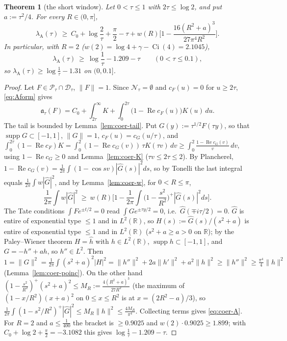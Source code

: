 \documentclass[11pt]{amsart}
\newtheorem{theorem}{Theorem}[section]
\theoremstyle{definition}
\theoremstyle{remark}
\newcommand{\R}{\mathbb R}
\newcommand{\Rel}{\operatorname{Re}}
\newcommand{\supp}{\operatorname{supp}}
\newcommand{\cF}{c_F}
\begin{document}
\begin{theorem}[the short window]\label{thm:coer-A}
Let $0<\tau\le1$ with $2\tau\le\log2$, and put $a:=\tau^2/4$. For every $R\in(0,\pi]$,
\begin{equation}\label{eq:coer-A}
\lambda_{\mathrm A}(\tau)\ \ge\ C_0+\log\frac2\tau+\frac\pi2-\tau+w(R)\Big[1-\frac{16(R^2+a)^3}{27\pi^4R^2}\Big].
\end{equation}
In particular, with $R=2$ ($w(2)=\log4+\gamma-\operatorname{Ci}(4)=2.1045$),
\[
\lambda_{\mathrm A}(\tau)\ \ge\ \log\frac1\tau-1.209-\tau\qquad(0<\tau\le0.1),
\]
so $\lambda_{\mathrm A}(\tau)\ge\log\frac1\tau-1.31$ on $(0,0.1]$.
\end{theorem}
\begin{proof}
Let $F\in\mathcal P_\tau\cap\mathcal D_\tau$, $\|F\|=1$. Since $\mathcal N_\tau=\emptyset$ and $\cF(u)=0$ for
$u\ge2\tau$, \eqref{eq:Aform} gives
\[
\mathfrak a_\tau(F)=C_0+\int_{2\tau}^\infty K+\int_0^{2\tau}\big(1-\Rel\cF(u)\big)K(u)\,du .
\]
The tail is bounded by Lemma~\ref{lem:coer-tail}. Put $G(y):=\tau^{1/2}F(\tau y)$, so that $\supp G\subset[-1,1]$,
$\|G\|=1$, $\cF(u)=c_G(u/\tau)$, and
$\int_0^{2\tau}(1-\Rel\cF)K=\int_0^2(1-\Rel c_G(v))\,\tau K(\tau v)\,dv\ge\int_0^2\frac{1-\Rel c_G(v)}v\,dv$,
using $1-\Rel c_G\ge0$ and Lemma~\ref{lem:coer-K} ($\tau v\le2\tau\le2$). By Plancherel,
$1-\Rel c_G(v)=\frac1{2\pi}\int(1-\cos sv)|\widehat G(s)|^2ds$, so by Tonelli the last integral equals
$\frac1{2\pi}\int w|\widehat G|^2$, and by Lemma~\ref{lem:coer-w}, for $0<R\le\pi$,
\[
\frac1{2\pi}\int w|\widehat G|^2\ \ge\ w(R)\Big[1-\frac1{2\pi}\int\Big(1-\frac{s^2}{R^2}\Big)^+|\widehat G(s)|^2ds\Big].
\]
The Tate conditions $\int Fe^{\pm t/2}=0$ read $\int Ge^{\pm\tau y/2}=0$, i.e.\ $\widehat G(\mp i\tau/2)=0$.
$\widehat G$ is entire of exponential type $\le1$ and in $L^2(\R)$, so $H(s):=\widehat G(s)/(s^2+a)$ is entire of
exponential type $\le1$ and in $L^2(\R)$ ($s^2+a\ge a>0$ on $\R$); by the Paley--Wiener theorem $H=\widehat h$ with
$h\in L^2(\R)$, $\supp h\subset[-1,1]$, and $G=-h''+ah$, so $h''\in L^2$. Then
$1=\|G\|^2=\frac1{2\pi}\int(s^2+a)^2|H|^2=\|h''\|^2+2a\|h'\|^2+a^2\|h\|^2\ge\|h''\|^2\ge\frac{\pi^4}4\|h\|^2$
(Lemma~\ref{lem:coer-poinc}). On the other hand $(1-\frac{s^2}{R^2})^+(s^2+a)^2\le M_R:=\frac{4(R^2+a)^3}{27R^2}$
(the maximum of $(1-x/R^2)(x+a)^2$ on $0\le x\le R^2$ is at $x=(2R^2-a)/3$), so
$\frac1{2\pi}\int(1-s^2/R^2)^+|\widehat G|^2\le M_R\|h\|^2\le\frac{4M_R}{\pi^4}$. Collecting terms gives
\eqref{eq:coer-A}. For $R=2$ and $a\le\frac1{400}$ the bracket is $\ge0.9025$ and $w(2)\cdot0.9025\ge1.899$;
with $C_0+\log2+\frac\pi2=-3.1082$ this gives $\log\frac1\tau-1.209-\tau$.
\end{proof}
\end{document}
